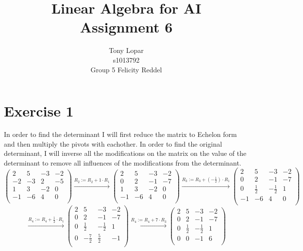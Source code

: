 \documentclass[a4paper]{article}
\title{Linear Algebra for AI\\Assignment 6}
\author{Tony Lopar \\ s1013792 \\ Group 5 \quad Felicity Reddel}
\begin{document}
\maketitle

\section*{Exercise 1}
In order to find the determinant I will first reduce the matrix to Echelon form and then multiply the pivots with eachother. In order to find the original determinant, I will inverse all the modifications on the matrix on the value of the determinant to remove all influences of the modifications from the determinant.
\[
\left(
\begin{array}{rrrr}
2 & 5 & -3 & -2 \\
-2 & -3 & 2 & -5 \\
1 & 3 & -2 & 0 \\
-1 & -6 & 4 & 0 \\
\end{array}
\right)
\xrightarrow{R_2 := R_2 + 1 \cdot R_1}
\left(
\begin{array}{rrrr}
2 & 5 & -3 & -2 \\
0 & 2 & -1 & -7 \\
1 & 3 & -2 & 0 \\
-1 & -6 & 4 & 0 \\
\end{array}
\right)
\xrightarrow{R_3 := R_3 + (- \frac{1}{2}) \cdot R_1}
\left(
\begin{array}{rrrr}
2 & 5 & -3 & -2 \\
0 & 2 & -1 & -7 \\
0 & \frac{1}{2} & - \frac{1}{2} & 1 \\
-1 & -6 & 4 & 0 \\
\end{array}
\right)
\]
\[
\xrightarrow{R_4 := R_4 + \frac{1}{2} \cdot R_1}
\left(
\begin{array}{rrrr}
2 & 5 & -3 & -2 \\
0 & 2 & -1 & -7 \\
0 & \frac{1}{2} & - \frac{1}{2} & 1 \\
0 & - \frac{7}{2} & \frac{5}{2} & -1 \\
\end{array}
\right)
\xrightarrow{R_4 := R_4 + 7 \cdot R_3}
\left(
\begin{array}{rrrr}
2 & 5 & -3 & -2 \\
0 & 2 & -1 & -7 \\
0 & \frac{1}{2} & - \frac{1}{2} & 1 \\
0 & 0 & -1 & 6 \\
\end{array}
\right)
\]
\end{document}
